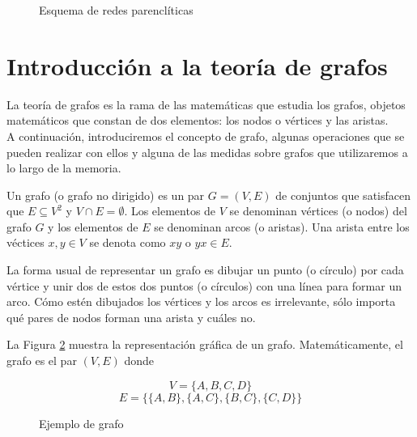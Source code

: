 \begin{figure}[htbp!]
	\begin{center}
		\resizebox{\textwidth}{!}{%
			\redesparencliticas
		}
	\end{center}
	\caption{Esquema de redes parenclíticas}
	\label{fig:redesparencliticas}
\end{figure}

\section{Introducción a la teoría de grafos}

La teoría de grafos es la rama de las matemáticas que estudia los grafos, objetos matemáticos que constan de dos elementos: los nodos o vértices y las aristas.\\

A continuación, introduciremos el concepto de grafo, algunas operaciones que se pueden realizar con ellos y alguna de las medidas sobre grafos que utilizaremos a lo largo de la memoria.\\

\begin{defi}
	Un grafo (o grafo no dirigido) es un par $G = (V,E)$ de conjuntos que satisfacen que $E \subseteq V^2$ y $V \cap E = \emptyset$. Los elementos de $V$ se denominan vértices (o nodos) del grafo $G$ y los elementos de $E$ se denominan arcos (o aristas). Una arista entre los véctices $x, y \in V$ se denota como $xy$ o $yx \in E$.
\end{defi}

La forma usual de representar un grafo es dibujar un punto (o círculo) por cada vértice y unir dos de estos dos puntos (o círculos) con una línea para formar un arco. Cómo estén dibujados los vértices y los arcos es irrelevante, sólo importa qué pares de nodos forman una arista y cuáles no.

\begin{ejemplo}
	
	La Figura \ref{fig:grafo} muestra la representación gráfica de un grafo. Matemáticamente, el grafo es el par $(V, E)$ donde
	
	\[ V = \{A, B, C, D\} \]
	\[ E = \{\{A,B\},\{A,C\},\{B,C\},\{C,D\} \} \]
	
	\begin{figure}[htb]
		\centering
		\ejemplografo
		\caption{Ejemplo de grafo}
		\label{fig:grafo}
	\end{figure}
	
\end{ejemplo}

